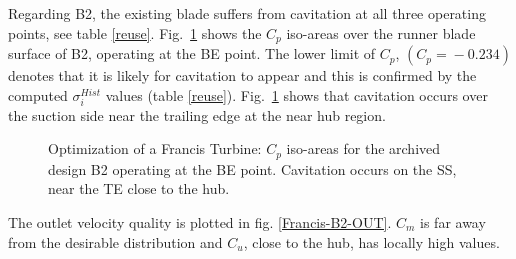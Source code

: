\FloatBarrier
Regarding B2, the existing blade suffers from cavitation at all three operating points, see table \ref{reuse}. Fig.\ \ref{Francis-B2-BE} shows the $C_p$ iso-areas over the runner blade surface of B2, operating at the BE point. The lower limit of $C_p$, $(C_p\!=\!-0.234)$ denotes that it is likely for cavitation to appear and this is confirmed by the computed $\sigma_i^{Hist}$ values (table \ref{reuse}). Fig.\ \ref{Francis-B2-BE} shows that cavitation occurs over the suction side near the trailing edge at the near hub region.     


\begin{figure}[h!]
\begin{minipage}[b]{1\linewidth}
 \centering
\end{minipage}
\caption{Optimization of a Francis Turbine: $C_p$ iso-areas for the archived design B2 operating at the BE point. Cavitation occurs on the SS, near the TE close to the hub.}
\label{Francis-B2-BE}
\end{figure}

The outlet velocity quality is plotted in fig. \ref{Francis-B2-OUT}. $C_m$ is far away from the desirable distribution and $C_u$, close to the hub, has locally high values.   

